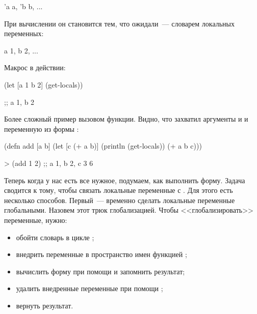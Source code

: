 \begin{english}
  \begin{clojure}
{'a a, 'b b, ...}
  \end{clojure}
\end{english}

При вычислении он становится тем, что ожидали~--- словарем локальных переменных:

\begin{english}
  \begin{clojure}
{a 1, b 2, ...}
  \end{clojure}
\end{english}

Макрос в действии:

\begin{english}
  \begin{clojure}
(let [a 1
      b 2]
  (get-locals))

;; {a 1, b 2}
  \end{clojure}
\end{english}

Более сложный пример вызовом функции. Видно, что  захватил аргументы  и  и переменную  из формы :

\begin{english}
  \begin{clojure}
(defn add [a b]
  (let [c (+ a b)]
    (println (get-locals))
    (+ a b c)))

> (add 1 2)
;; {a 1, b 2, c 3}
6
  \end{clojure}
\end{english}

Теперь когда у нас есть все нужное, подумаем, как выполнить форму. Задача сводится к тому, чтобы связать локальные переменные с . Для этого есть несколько способов. Первый~--- временно сделать локальные переменные глобальными. Назовем этот трюк глобализацией. Чтобы <<глобализировать>> переменные, нужно:

\begin{itemize}

\item
  обойти словарь  в цикле ;

\item
  внедрить переменные в пространство имен функцией ;

\item
  вычислить форму при помощи  и запомнить результат;

\item
  удалить внедренные переменные при помощи ;

\item
  вернуть результат.

\end{itemize}


